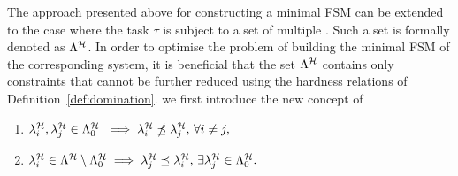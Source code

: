 The approach presented above for constructing a minimal FSM can be extended to the case where the task $\tau$ is subject to a set of multiple \ewhc{}. 
Such a set is formally denoted as $\Lambda^{\mathcal{H}}$.
%
In order to optimise the problem of building the minimal FSM of the corresponding system, it is beneficial that the set $\Lambda^{\mathcal{H}}$ contains only constraints that cannot be further reduced using the hardness relations of Definition~\ref{def:domination}. 
 we first introduce the new concept of 
%
\begin{definition}%
    \label{def:dominant-set}%
    \begin{enumerate}[label=(\roman*)]
        \item $\lambda^{\mathcal{H}}_i,\lambda^{\mathcal{H}}_j \in \Lambda^{\mathcal{H}}_0 \,\,\implies \lambda^{\mathcal{H}}_i \npreceq \lambda^{\mathcal{H}}_j,\, \forall i \neq j,$
        \item $\lambda^{\mathcal{H}}_i \in \Lambda^{\mathcal{H}} \setminus \Lambda^{\mathcal{H}}_0 \implies
            \lambda^{\mathcal{H}}_j \preceq \lambda^{\mathcal{H}}_i,\, \exists \lambda^{\mathcal{H}}_j \in \Lambda^{\mathcal{H}}_0.$
    \end{enumerate}
\end{definition}

